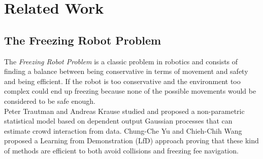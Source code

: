 \section{Related Work}
\label{sec:re_work}

\subsection{The Freezing Robot Problem}
The \emph{Freezing Robot Problem} is a classic problem in robotics and consists of finding a balance between being conservative in terms of movement and safety and being efficient. If the robot is too conservative and the environment too complex could end up freezing because none of the possible movements would be considered to be safe enough. \\

Peter Trautman and Andreas Krause \cite{conf/iros/TrautmanK10} studied and proposed a non-parametric statistical model based on dependent output Gaussian processes that can estimate crowd interaction from data. Chung-Che Yu and Chieh-Chih Wang \cite{6395022} proposed a Learning from Demonstration (LfD) approach proving that these kind of methods are efficient to both avoid collisions and freezing fee navigation.
